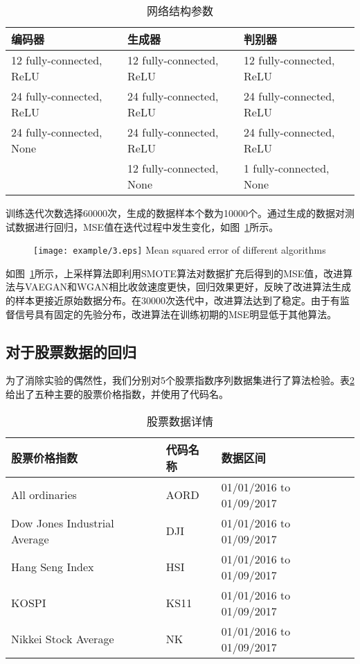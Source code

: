 \begin{table}[hpb]
	\centering
	\caption{网络结构参数}
	\label{tab3}
	\begin{tabular}{lll} \toprule
		编码器   & 生成器 & 判别器  \\  \midrule
		12 fully-connected, ReLU &12 fully-connected, ReLU&12 fully-connected, ReLU\\
		24 fully-connected, ReLU&24 fully-connected, ReLU&24 fully-connected, ReLU\\
		24 fully-connected, None&24 fully-connected, ReLU&24 fully-connected, ReLU\\
		&12 fully-connected, None&1 fully-connected, None\\ \bottomrule
	\end{tabular}
\end{table}

训练迭代次数选择60000次，生成的数据样本个数为10000个。通过生成的数据对测试数据进行回归，MSE值在迭代过程中发生变化，如图~\ref{fig3}所示。

\begin{figure}[htpb]
	\centering
	\texttt{[image: example/3.eps]}
	{Mean squared error of different algorithms}
	\label{fig3}
\end{figure}

如图~\ref{fig3}所示，上采样算法即利用SMOTE算法对数据扩充后得到的MSE值，改进算法与VAEGAN和WGAN相比收敛速度更快，回归效果更好，反映了改进算法生成的样本更接近原始数据分布。在30000次迭代中，改进算法达到了稳定。由于有监督信号具有固定的先验分布，改进算法在训练初期的MSE明显低于其他算法。

\subsection{对于股票数据的回归}

为了消除实验的偶然性，我们分别对5个股票指数序列数据集进行了算法检验。表\ref{tab1}给出了五种主要的股票价格指数，并使用了代码名。

\begin{table}[hpb]
	\centering
	\caption{股票数据详情}
	\label{tab1}
	\begin{tabular}{lll} \toprule
		股票价格指数   & 代码名称 &  数据区间  \\  \midrule
		All ordinaries   & AORD&  01/01/2016 to 01/09/2017 \\
		Dow Jones Industrial Average   & DJI&01/01/2016 to 01/09/2017\\
		Hang Seng Index   & HSI&   01/01/2016 to 01/09/2017\\
		KOSPI   & KS11& 01/01/2016 to 01/09/2017\\
		Nikkei Stock Average   &NK&   01/01/2016 to 01/09/2017\\
		\bottomrule
	\end{tabular}
\end{table}

